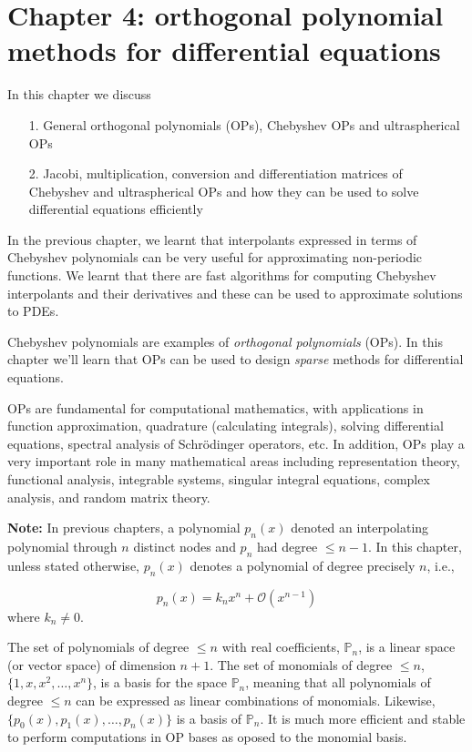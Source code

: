 \documentclass[12pt,landscape]{article}
\begin{document}
{\Huge
\sf
\section{Chapter 4: orthogonal polynomial methods for differential equations}
In this chapter we discuss

\begin{itemize}
\item[1. ] General orthogonal polynomials (OPs), Chebyshev OPs and ultraspherical OPs


\item[2. ] Jacobi, multiplication, conversion and differentiation matrices of Chebyshev and ultraspherical OPs and how they can be used to solve differential equations efficiently

\end{itemize}
In the previous chapter, we learnt that interpolants expressed in terms of Chebyshev polynomials can be very useful for approximating non-periodic functions.  We learnt that there are fast algorithms for computing Chebyshev interpolants and their derivatives and these can be used to approximate solutions to PDEs.

Chebyshev polynomials are examples of \emph{orthogonal polynomials} (OPs).  In this chapter we'll learn that OPs can be used to design \emph{sparse} methods for differential equations.

OPs are fundamental for computational mathematics, with applications in function approximation, quadrature (calculating integrals), solving differential equations, spectral analysis of Schrödinger operators, etc.  In addition, OPs play a very important role in many mathematical areas including representation theory, functional analysis, integrable systems, singular integral equations, complex analysis, and random matrix theory.

\textbf{Note:} In previous chapters, a polynomial $p_n(x)$ denoted an interpolating polynomial through $n$ distinct nodes and $p_n$ had degree $\leq n-1$.  In this chapter, unless stated otherwise, $p_n(x)$ denotes a polynomial of degree precisely $n$, i.e., 

\[
p_n(x) = k_n x^n + \mathcal{O}(x^{n-1})
\]
where $k_n \neq 0$.

The set of polynomials of degree $\leq n$ with real coefficients, $\mathbb{P}_n$, is a linear space (or vector space) of dimension $n+1$.  The set of  monomials of degree $\leq n$, $\lbrace 1, x, x^2, \ldots, x^n \rbrace$, is a basis for the space $\mathbb{P}_n$, meaning that all polynomials of degree $\leq n$ can be expressed as linear combinations of monomials.  Likewise, $\lbrace p_0(x), p_1(x), \ldots, p_n(x) \rbrace$ is a basis of $\mathbb{P}_n$.  It is much  more efficient and stable to perform computations in OP bases as oposed to the monomial basis.

}
\end{document}
